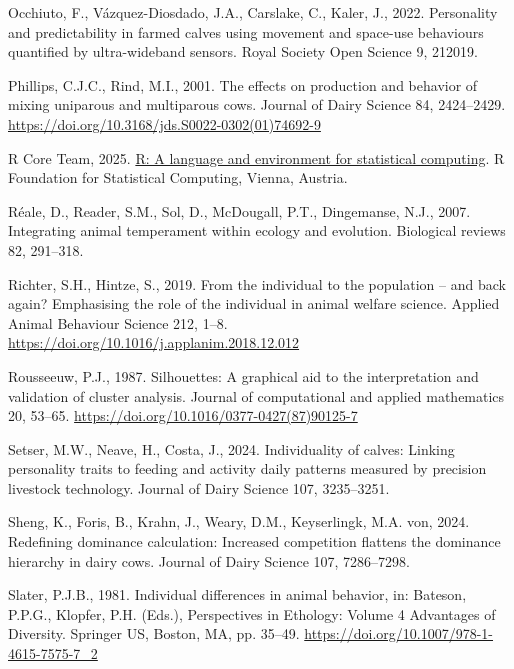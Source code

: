 \documentclass[
]{article}
\newlength{\cslhangindent}
\newenvironment{CSLReferences}[2] %
 {\begin{list}{}{%
  \setlength{\itemindent}{0pt}
  \setlength{\leftmargin}{0pt}
  \setlength{\parsep}{0pt}
  \ifodd #1
   \setlength{\leftmargin}{\cslhangindent}
   \setlength{\itemindent}{-1\cslhangindent}
  \fi
  \setlength{\itemsep}{#2\baselineskip}}}
 {\end{list}}
\begin{document}
\begin{CSLReferences}{1}{0}
Occhiuto, F., Vázquez-Diosdado, J.A., Carslake, C., Kaler, J., 2022.
Personality and predictability in farmed calves using movement and
space-use behaviours quantified by ultra-wideband sensors. Royal Society
Open Science 9, 212019.

Phillips, C.J.C., Rind, M.I., 2001. The effects on production and
behavior of mixing uniparous and multiparous cows. Journal of Dairy
Science 84, 2424--2429.
\url{https://doi.org/10.3168/jds.S0022-0302(01)74692-9}

R Core Team, 2025. \href{https://www.R-project.org/}{R: A language and
environment for statistical computing}. R Foundation for Statistical
Computing, Vienna, Austria.

Réale, D., Reader, S.M., Sol, D., McDougall, P.T., Dingemanse, N.J.,
2007. Integrating animal temperament within ecology and evolution.
Biological reviews 82, 291--318.

Richter, S.H., Hintze, S., 2019. From the individual to the population
-- and back again? Emphasising the role of the individual in animal
welfare science. Applied Animal Behaviour Science 212, 1--8.
\url{https://doi.org/10.1016/j.applanim.2018.12.012}

Rousseeuw, P.J., 1987. Silhouettes: A graphical aid to the
interpretation and validation of cluster analysis. Journal of
computational and applied mathematics 20, 53--65.
\url{https://doi.org/10.1016/0377-0427(87)90125-7}

Setser, M.W., Neave, H., Costa, J., 2024. Individuality of calves:
Linking personality traits to feeding and activity daily patterns
measured by precision livestock technology. Journal of Dairy Science
107, 3235--3251.

Sheng, K., Foris, B., Krahn, J., Weary, D.M., Keyserlingk, M.A. von,
2024. Redefining dominance calculation: Increased competition flattens
the dominance hierarchy in dairy cows. Journal of Dairy Science 107,
7286--7298.

Slater, P.J.B., 1981. Individual differences in animal behavior, in:
Bateson, P.P.G., Klopfer, P.H. (Eds.), Perspectives in Ethology: Volume
4 Advantages of Diversity. Springer US, Boston, MA, pp. 35--49.
\url{https://doi.org/10.1007/978-1-4615-7575-7_2}


\end{CSLReferences}
\end{document}
